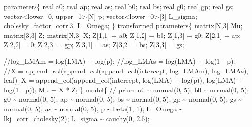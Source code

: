 \documentclass[
  12pt,
  letterpaper,
  DIV=11,
  numbers=noendperiod]{scrartcl}
\newenvironment{Shaded}{\begin{snugshade}}{\end{snugshade}}
\newcommand{\CommentTok}[1]{\textcolor[rgb]{0.37,0.37,0.37}{#1}}
\newcommand{\DataTypeTok}[1]{\textcolor[rgb]{0.68,0.00,0.00}{#1}}
\newcommand{\DecValTok}[1]{\textcolor[rgb]{0.68,0.00,0.00}{#1}}
\newcommand{\FloatTok}[1]{\textcolor[rgb]{0.68,0.00,0.00}{#1}}
\newcommand{\KeywordTok}[1]{\textcolor[rgb]{0.00,0.23,0.31}{#1}}
\newcommand{\NormalTok}[1]{\textcolor[rgb]{0.00,0.23,0.31}{#1}}
\begin{document}
\begin{Shaded}
\begin{Highlighting}[]
\KeywordTok{parameters}\NormalTok{\{}
  \DataTypeTok{real}\NormalTok{ a0;}
  \DataTypeTok{real}\NormalTok{ ap;}
  \DataTypeTok{real}\NormalTok{ as;}
  \DataTypeTok{real}\NormalTok{ b0;}
  \DataTypeTok{real}\NormalTok{ bs;}
  \DataTypeTok{real}\NormalTok{ g0;}
  \DataTypeTok{real}\NormalTok{ gp;}
  \DataTypeTok{real}\NormalTok{ gs;}
  \DataTypeTok{vector}\NormalTok{\textless{}}\KeywordTok{lower}\NormalTok{=}\DecValTok{0}\NormalTok{, }\KeywordTok{upper}\NormalTok{=}\DecValTok{1}\NormalTok{\textgreater{}[N] p;}
  \DataTypeTok{vector}\NormalTok{\textless{}}\KeywordTok{lower}\NormalTok{=}\DecValTok{0}\NormalTok{\textgreater{}[}\DecValTok{3}\NormalTok{] L\_sigma;}
  \DataTypeTok{cholesky\_factor\_corr}\NormalTok{[}\DecValTok{3}\NormalTok{] L\_Omega;}
\NormalTok{\}}
\KeywordTok{transformed parameters}\NormalTok{\{}
  \DataTypeTok{matrix}\NormalTok{[N,}\DecValTok{3}\NormalTok{] Mu;}
  \DataTypeTok{matrix}\NormalTok{[}\DecValTok{3}\NormalTok{,}\DecValTok{3}\NormalTok{] Z;}
  \DataTypeTok{matrix}\NormalTok{[N,}\DecValTok{3}\NormalTok{] X;}
\NormalTok{  Z[}\DecValTok{1}\NormalTok{,}\DecValTok{1}\NormalTok{] = a0;}
\NormalTok{  Z[}\DecValTok{1}\NormalTok{,}\DecValTok{2}\NormalTok{] = b0;}
\NormalTok{  Z[}\DecValTok{1}\NormalTok{,}\DecValTok{3}\NormalTok{] = g0;}
\NormalTok{  Z[}\DecValTok{2}\NormalTok{,}\DecValTok{1}\NormalTok{] = ap;}
\NormalTok{  Z[}\DecValTok{2}\NormalTok{,}\DecValTok{2}\NormalTok{] = }\DecValTok{0}\NormalTok{;}
\NormalTok{  Z[}\DecValTok{2}\NormalTok{,}\DecValTok{3}\NormalTok{] = gp;}
\NormalTok{  Z[}\DecValTok{3}\NormalTok{,}\DecValTok{1}\NormalTok{] = as;}
\NormalTok{  Z[}\DecValTok{3}\NormalTok{,}\DecValTok{2}\NormalTok{] = bs;}
\NormalTok{  Z[}\DecValTok{3}\NormalTok{,}\DecValTok{3}\NormalTok{] = gs;}

  \CommentTok{//log\_LMAm = log(LMA) + log(p);}
  \CommentTok{//log\_LMAs = log(LMA) + log(1 {-} p);}
  \CommentTok{//X = append\_col(append\_col(append\_col(intercept, log\_LMAm), log\_LMAs), leaf);}
\NormalTok{  X = append\_col(append\_col(intercept, log(LMA) + log(p)), log(LMA) + log(}\DecValTok{1}\NormalTok{ {-} p));}
\NormalTok{  Mu = X * Z;}
\NormalTok{\}}
\KeywordTok{model}\NormalTok{\{}
  \CommentTok{// priors}
\NormalTok{  a0 \textasciitilde{} normal(}\DecValTok{0}\NormalTok{, }\DecValTok{5}\NormalTok{);}
\NormalTok{  b0 \textasciitilde{} normal(}\DecValTok{0}\NormalTok{, }\DecValTok{5}\NormalTok{);}
\NormalTok{  g0 \textasciitilde{} normal(}\DecValTok{0}\NormalTok{, }\DecValTok{5}\NormalTok{);}
\NormalTok{  ap \textasciitilde{} normal(}\DecValTok{0}\NormalTok{, }\DecValTok{5}\NormalTok{);}
\NormalTok{  bs \textasciitilde{} normal(}\DecValTok{0}\NormalTok{, }\DecValTok{5}\NormalTok{);}
\NormalTok{  gp \textasciitilde{} normal(}\DecValTok{0}\NormalTok{, }\DecValTok{5}\NormalTok{);}
\NormalTok{  gs \textasciitilde{} normal(}\DecValTok{0}\NormalTok{, }\DecValTok{5}\NormalTok{);}
\NormalTok{  as \textasciitilde{} normal(}\DecValTok{0}\NormalTok{, }\DecValTok{5}\NormalTok{);}
\NormalTok{  p \textasciitilde{} beta(}\DecValTok{1}\NormalTok{, }\DecValTok{1}\NormalTok{);}
\NormalTok{  L\_Omega \textasciitilde{} lkj\_corr\_cholesky(}\DecValTok{2}\NormalTok{);}
\NormalTok{  L\_sigma \textasciitilde{} cauchy(}\DecValTok{0}\NormalTok{, }\FloatTok{2.5}\NormalTok{);}


\end{Highlighting}
\end{Shaded}
\end{document}
